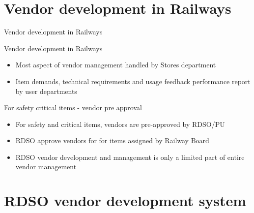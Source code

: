 \documentclass[
  10pt,
  ignorenonframetext,
  aspectratio=43,
]{beamer}
\providecommand{\tightlist}{%
  \setlength{\itemsep}{0pt}\setlength{\parskip}{0pt}}
\begin{document}
\hypertarget{vendor-development-in-railways}{%
\section{Vendor development in
Railways}\label{vendor-development-in-railways}}

\begin{frame}{Vendor development in Railways}
\begin{block}{Vendor development in Railways}
\protect\hypertarget{vendor-development-in-railways-1}{}
\begin{itemize}
\tightlist
\item
  Most aspect of vendor management handled by Stores department
\item
  Item demands, technical requirements and usage feedback performance
  report by user departments
\end{itemize}
\end{block}

\begin{block}{For safety critical items - vendor pre approval}
\protect\hypertarget{for-safety-critical-items---vendor-pre-approval}{}
\begin{itemize}
\tightlist
\item
  For safety and critical items, vendors are pre-approved by RDSO/PU
\item
  RDSO approve vendors for for items assigned by Railway Board
\item
  RDSO vendor development and management is only a limited part of
  entire vendor management
\end{itemize}
\end{block}
\end{frame}

\hypertarget{rdso-vendor-development-system}{%
\section{RDSO vendor development
system}\label{rdso-vendor-development-system}}
\end{document}
